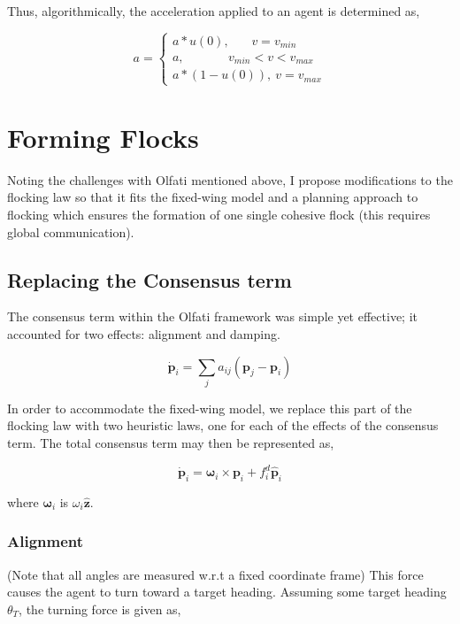 \documentclass[letterpaper, 10 pt, conference]{ieeeconf}  %
\begin{document}
Thus, algorithmically, the acceleration applied to an agent is determined as,

\begin{equation}
    a = 
    \begin{cases}
        a * u(0), \ \ \ \ \ \ \ \ v = v_{min} \\
        a, \ \ \ \ \ \ \ \ \ \ \ \ \ \ \ \ v_{min} < v < v_{max} \\
        a  * (1 - u(0)), \ v = v_{max}
    \end{cases}
\end{equation}

\section{Forming Flocks}

Noting the challenges with Olfati mentioned above, I propose modifications to the flocking law so that it fits the fixed-wing model and a planning approach to flocking which ensures the formation of one single cohesive flock (this requires global communication).

\subsection{Replacing the Consensus term}

The consensus term within the Olfati framework was simple yet effective; it accounted for two effects: alignment and damping.

\begin{equation}
    \dot{\mathbf{p}}_i = \sum_j a_{ij}(\mathbf{p}_j - \mathbf{p}_i)
\end{equation}

In order to accommodate the fixed-wing model, we replace this part of the flocking law with two heuristic laws, one for each of the effects of the consensus term. The total consensus term may then be represented as,

\begin{equation}
    \dot{\mathbf{p}}_i = \boldsymbol{\omega}_i \times \mathbf{p}_i + f_i^d \hat{\mathbf{p}}_i
\end{equation}

where $\boldsymbol{\omega}_i$ is $\omega_i\hat{\mathbf{z}}$. 

\vspace{5pt}

\subsubsection{Alignment}
(Note that all angles are measured w.r.t a fixed coordinate frame) This force causes the agent to turn toward a target heading. Assuming some target heading $\theta_T$, the turning force is given as,
\end{document}
